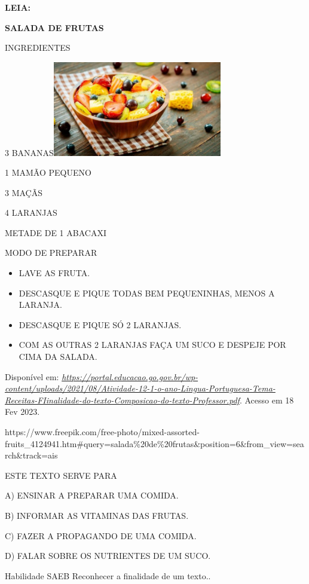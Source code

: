 \begin{escola}
\textbf{LEIA:}

\textbf{SALADA DE FRUTAS}

INGREDIENTES

3
BANANAS\includegraphics[width=2.90350in,height=1.63264in]{media/image159.jpg}

1 MAMÃO PEQUENO

3 MAÇÃS

4 LARANJAS

METADE DE 1 ABACAXI

MODO DE PREPARAR

\begin{itemize}
\item
  LAVE AS FRUTA.
\item
  DESCASQUE E PIQUE TODAS BEM PEQUENINHAS, MENOS A LARANJA.
\item
  DESCASQUE E PIQUE SÓ 2 LARANJAS.
\item
  COM AS OUTRAS 2 LARANJAS FAÇA UM SUCO E DESPEJE POR CIMA DA SALADA.
\end{itemize}

Disponível em:
\href{https://portal.educacao.go.gov.br/wp-content/uploads/2021/08/Atividade-12-1-o-ano-Lingua-Portuguesa-Tema-Receitas-FIinalidade-do-texto-Composicao-do-texto-Professor.pdf}{\emph{https://portal.educacao.go.gov.br/wp-content/uploads/2021/08/Atividade-12-1-o-ano-Lingua-Portuguesa-Tema-Receitas-FIinalidade-do-texto-Composicao-do-texto-Professor.pdf}}.
Acesso em 18 Fev 2023.

https://www.freepik.com/free-photo/mixed-assorted-fruits\_4124941.htm\#query=salada\%20de\%20frutas\&position=6\&from\_view=search\&track=ais

ESTE TEXTO SERVE PARA

A) ENSINAR A PREPARAR UMA COMIDA.

B) INFORMAR AS VITAMINAS DAS FRUTAS.

C) FAZER A PROPAGANDO DE UMA COMIDA.

D) FALAR SOBRE OS NUTRIENTES DE UM SUCO.

Habilidade SAEB Reconhecer a finalidade de um texto..


\end{escola}

